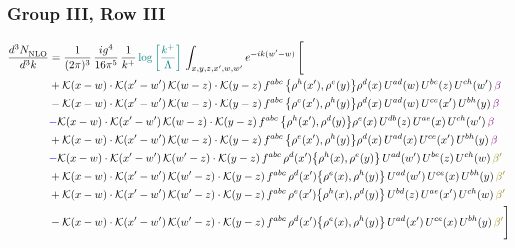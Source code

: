 \documentclass[9pt]{article}
\numberwithin{equation}{section}
\begin{document}
\subsubsection{Group III, Row III} 
\begin{align}
     \frac{d^{3}N_{\rm NLO}^{\rm}}{d^{3}k}  & = \frac{1}{(2\pi)^{3}}\, \frac{ig^{4}}{16\pi^{5}}\, \frac{1}{k^{+}}\, {\color{teal}\log{\left[\frac{k^{+}}{\Lambda}\right]}}\, \int_{x,y,z,x^{\prime},w,w^{\prime}}e^{-ik(w^{\prime}-w)}\, \Bigg[\notag \\ & +\mathcal{K}(x-w)\cdot\mathcal{K}(x'-w')\,\mathcal{K}(w-z)\cdot\mathcal{K}(y-z)\, f^{abc}\,\big\{\rho^{h}(x'),\rho^{e}(y)\big\}\rho^{d}(x)\,U^{ad}(w)\,U^{be}(z)\,U^{ch}(w')\,{\color{violet}\beta}\notag\\
&-\mathcal{K}(x-w)\cdot\mathcal{K}(x'-w')\,\mathcal{K}(w-z)\cdot\mathcal{K}(y-z)\, f^{abc}\,\big\{\rho^{e}(x'),\rho^{h}(y)\big\}\rho^{d}(x)\,U^{ad}(w)\,U^{ce}(x')\,U^{bh}(y)\,{\color{violet}\beta}\notag\\ &{\color{red}\-}{\color{blue} -}\mathcal{K}(x-w)\cdot\mathcal{K}(x'-w')\,\mathcal{K}(w-z)\cdot\mathcal{K}(y-z)\, f^{abc}\,\big\{\rho^{h}(x'),\rho^{d}(y)\big\}\rho^{e}(x)\,U^{db}(z)\,U^{ae}(x)\,U^{ch}(w')\,{\color{violet}\beta}\notag\\ & +\mathcal{K}(x-w)\cdot\mathcal{K}(x'-w')\,\mathcal{K}(w-z)\cdot\mathcal{K}(y-z)\, f^{abc}\,\big\{\rho^{e}(x'),\rho^{h}(y)\big\}\rho^{d}(x)\,U^{ad}(x)\,U^{ce}(x')\,U^{bh}(y)\,{\color{violet}\beta}\notag\\ &{\color{red}\-}{\color{blue} -}\mathcal{K}(x-w)\cdot\mathcal{K}(x'-w')\,\mathcal{K}(w'-z)\cdot\mathcal{K}(y-z)\, f^{abc}\,\rho^{d}(x')\big\{\rho^{h}(x),\rho^{e}(y)\big\}\,U^{ad}(w')\,U^{be}(z)\,U^{ch}(w)\,{\color{olive}\beta'}\notag\\ &+\mathcal{K}(x-w)\cdot\mathcal{K}(x'-w')\,\mathcal{K}(w'-z)\cdot\mathcal{K}(y-z)\, f^{abc}\,\rho^{d}(x')\big\{\rho^{e}(x),\rho^{h}(y)\big\}\,U^{ad}(w')\,U^{ce}(x)\,U^{bh}(y)\,{\color{olive}\beta'} \notag\\ & +\mathcal{K}(x-w)\cdot\mathcal{K}(x'-w')\,\mathcal{K}(w'-z)\cdot\mathcal{K}(y-z)\, f^{abc}\,\rho^{e}(x')\big\{\rho^{h}(x),\rho^{d}(y)\big\}\,U^{bd}(z)\,U^{ae}(x')\,U^{ch}(w)\,{\color{olive}\beta'} \notag\\ & -\mathcal{K}(x-w)\cdot\mathcal{K}(x'-w')\,\mathcal{K}(w'-z)\cdot\mathcal{K}(y-z)\, f^{abc}\,\rho^{d}(x')\big\{\rho^{e}(x),\rho^{h}(y)\big\}\,U^{ad}(x')\,U^{ce}(x)\,U^{bh}(y)\,{\color{olive}\beta'}\Bigg]\end{align}     
\end{document}
